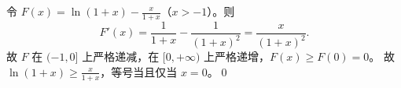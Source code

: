 令 $F(x)=\ln(1+x)-\frac{x}{1+x}$（$x>-1$）。则
\[
F'(x)=\frac1{1+x}-\frac1{(1+x)^2}=\frac{x}{(1+x)^2}.
\]
故 $F$ 在 $(-1,0]$ 上严格递减，在 $[0,+\infty)$ 上严格递增，$F(x)\ge F(0)=0$。
故 $\boxed{\ln(1+x)\ge\frac{x}{1+x}}$，等号当且仅当 $x=0$。\qed
